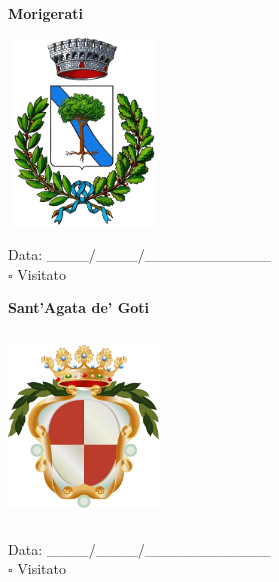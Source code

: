 \documentclass[a5paper,12pt]{article}
\begin{document}
\vspace{0.7cm}

\noindent
\begin{minipage}[t]{0.45\textwidth}
    \begin{center}
        \textbf{Morigerati}
    \end{center}
    \vspace{-0.5cm} %
    \begin{center}
        \includegraphics[height= 5cm, width=4cm]{Campania/Morigerati-Stemma.png}
    \end{center}
    \vspace{-0.4cm} %
    \begin{flushleft}
        Data: \_\_\_\_/\_\_\_\_/\_\_\_\_\_\_\_\_\_\_\_\_ \\
        $\square$ Visitato
    \end{flushleft}
\end{minipage}
\hfill
\noindent
\begin{minipage}[t]{0.45\textwidth}
    \begin{center}
        \textbf{Sant'Agata de' Goti}
    \end{center}
    \vspace{-0.5cm} %
    \begin{center}
        \includegraphics[height= 5cm, width=4cm]{Campania/Sant'Agata_de'_Goti-Stemma.png}
    \end{center}
    \vspace{-0.4cm} %
    \begin{flushleft}
        Data: \_\_\_\_/\_\_\_\_/\_\_\_\_\_\_\_\_\_\_\_\_ \\
        $\square$ Visitato
    \end{flushleft}
\end{minipage}
\end{document}
